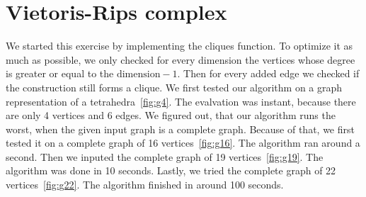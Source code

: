 \documentclass{article}
\begin{document}
\section{Vietoris-Rips complex}\label{sec:p3}

We started this exercise by implementing the cliques function. To optimize it as much as possible, we only checked for every dimension the vertices whose degree is greater or equal to the $\text{dimension} - 1$. Then for every added edge we checked if the construction still forms a clique. We first tested our algorithm on a graph representation of a tetrahedra~\ref{fig:g4}. The evalvation was instant, because there are only 4 vertices and 6 edges. We figured out, that our algorithm runs the worst, when the given input graph is a complete graph. Because of that, we first tested it on a complete graph of 16 vertices~\ref{fig:g16}. The algorithm ran around a second. Then we inputed the complete graph of 19 vertices~\ref{fig:g19}. The algorithm was done in 10 seconds. Lastly, we tried the complete graph of 22 vertices~\ref{fig:g22}. The algorithm finished in around 100 seconds.
\end{document}
